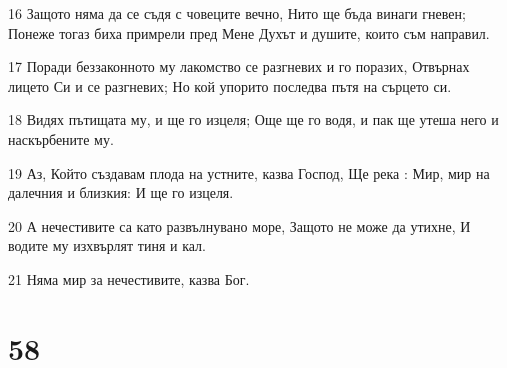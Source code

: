 \par 16 Защото няма да се съдя с човеците вечно, Нито ще бъда винаги гневен; Понеже тогаз биха примрели пред Мене Духът и душите, които съм направил.
\par 17 Поради беззаконното му лакомство се разгневих и го поразих, Отвърнах лицето Си и се разгневих; Но кой упорито последва пътя на сърцето си.
\par 18 Видях пътищата му, и ще го изцеля; Още ще го водя, и пак ще утеша него и наскърбените му.
\par 19 Аз, Който създавам плода на устните, казва Господ, Ще река : Мир, мир на далечния и близкия: И ще го изцеля.
\par 20 А нечестивите са като развълнувано море, Защото не може да утихне, И водите му изхвърлят тиня и кал.
\par 21 Няма мир за нечестивите, казва Бог.

\chapter{58}

